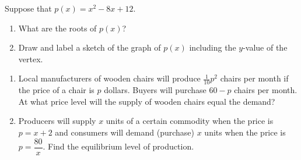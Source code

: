 \documentclass[10pt]{article}
\begin{document}
\newpage
\noindent
Suppose that $p(x) = x^2 - 8x + 12$. 

\begin{multicols}{2}
\begin{enumerate}
\setcounter{enumi}{\theenumCount}
\item What are the roots of $p(x)$? 
\item Draw and label a sketch of the graph of $p(x)$ including the $y$-value of the vertex. 
\setcounter{enumCount}{\theenumi}
\end{enumerate}
\end{multicols}
\vfill


\begin{enumerate}
\setcounter{enumi}{\theenumCount}
\item Local manufacturers of wooden chairs will produce $\frac{1}{10}p^2$ chairs per month if the price of a chair is $p$ dollars. Buyers will purchase $60 - p$ chairs per month.  At what price level will the supply of wooden chairs equal the demand?  
\vfill

\item Producers will supply $x$ units of a certain commodity when the price is $p = x + 2$ and consumers will demand (purchase) $x$ units when the price is $p = \dfrac{80}{x}$.  Find the equilibrium level of production.  
\vfill

\end{enumerate}
\end{document}
